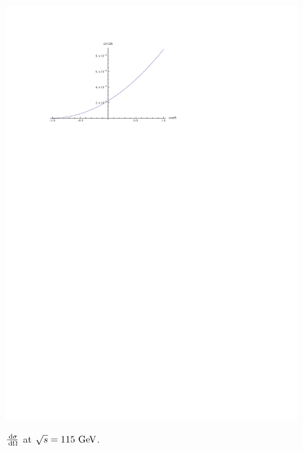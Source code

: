\documentclass[]{article}
\begin{document}
\begin{figure}[H]
{		\includegraphics[scale=0.7]{sm_above}
	}
	\caption{$\frac{\,\operatorname{d}\!{\sigma}}{\,\operatorname{d}\!{\Omega}}$ at $\sqrt{s}=115\GeV$.}
	\label{fig:diffabove}
\end{figure}
\end{document}
